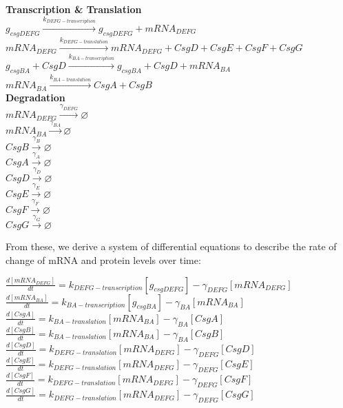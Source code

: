 \documentclass[11pt, oneside]{article}   	%
\begin{document}
\begin{center}
\textbf{Transcription \& Translation} \\
\bigskip
$g_{csgDEFG} \xrightarrow{k_{DEFG-transcription}}  g_{csgDEFG} + mRNA_{DEFG}$ \\
\bigskip
$mRNA_{DEFG} \xrightarrow{k_{DEFG-translation}} mRNA_{DEFG} + CsgD + CsgE + CsgF + CsgG$ \\
\bigskip
$g_{csgBA} + CsgD \xrightarrow{k_{BA-transcription}}  g_{csgBA} + CsgD + mRNA_{BA} $ \\
\bigskip
$mRNA_{BA} \xrightarrow{k_{BA-translation}} CsgA + CsgB$ \\ 

\hfill \break
\textbf{Degradation} \\
\bigskip
$mRNA_{DEFG} \xrightarrow{\gamma_{DEFG}} \varnothing$ \\ 
\bigskip
$mRNA_{BA} \xrightarrow{\gamma_{BA}}  \varnothing$ \\ 
\bigskip
$CsgB \xrightarrow{\gamma_{B}}  \varnothing$ \\ 
\bigskip
$CsgA \xrightarrow{\gamma_{A}}  \varnothing$ \\
\bigskip
$CsgD \xrightarrow{\gamma_{D}}  \varnothing$ \\
\bigskip
$CsgE \xrightarrow{\gamma_{E}}  \varnothing$ \\
\bigskip
$CsgF \xrightarrow{\gamma_{F}}  \varnothing$ \\
\bigskip
$CsgG \xrightarrow{\gamma_{G}}  \varnothing$ \\

\end{center}

From these, we derive a system of differential equations to describe the rate of change of mRNA and protein levels over time:

\begin{center}
$\frac{d[mRNA_{DEFG}]}{dt} = k_{DEFG-transcription}[g_{csgDEFG}] - \gamma_{DEFG}[mRNA_{DEFG}]$ \\
\bigskip
$\frac{d[mRNA_{BA}]}{dt} = k_{BA-transcription}[g_{csgBA}] - \gamma_{BA}[mRNA_{BA}]$ \\
\bigskip
$\frac{d[CsgA]}{dt} = k_{BA-translation}[mRNA_{BA}] - \gamma_{BA}[CsgA]$ \\
\bigskip
$\frac{d[CsgB]}{dt} =  k_{BA-translation}[mRNA_{BA}] - \gamma_{BA}[CsgB]$ \\
\bigskip
$\frac{d[CsgD]}{dt} =  k_{DEFG-translation}[mRNA_{DEFG}] - \gamma_{DEFG}[CsgD]$ \\
\bigskip
$\frac{d[CsgE]}{dt} =  k_{DEFG-translation}[mRNA_{DEFG}] - \gamma_{DEFG}[CsgE]$ \\
\bigskip
$\frac{d[CsgF]}{dt} =  k_{DEFG-translation}[mRNA_{DEFG}] - \gamma_{DEFG}[CsgF]$ \\
\bigskip
$\frac{d[CsgG]}{dt} =  k_{DEFG-translation}[mRNA_{DEFG}] - \gamma_{DEFG}[CsgG]$ \\


\end{center}
\end{document}
